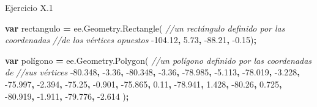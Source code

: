 \documentclass[
]{article}
\newenvironment{Shaded}{\begin{snugshade}}{\end{snugshade}}
\newcommand{\AttributeTok}[1]{\textcolor[rgb]{0.77,0.63,0.00}{#1}}
\newcommand{\CommentTok}[1]{\textcolor[rgb]{0.56,0.35,0.01}{\textit{#1}}}
\newcommand{\FloatTok}[1]{\textcolor[rgb]{0.00,0.00,0.81}{#1}}
\newcommand{\KeywordTok}[1]{\textcolor[rgb]{0.13,0.29,0.53}{\textbf{#1}}}
\newcommand{\NormalTok}[1]{#1}
\newcommand{\OperatorTok}[1]{\textcolor[rgb]{0.81,0.36,0.00}{\textbf{#1}}}
\newcommand{\VariableTok}[1]{\textcolor[rgb]{0.00,0.00,0.00}{#1}}
\begin{document}
Ejercicio X.1

\begin{Shaded}
\begin{Highlighting}[]
\KeywordTok{var}\NormalTok{ rectangulo }\OperatorTok{=} \VariableTok{ee}\NormalTok{.}\VariableTok{Geometry}\NormalTok{.}\AttributeTok{Rectangle}\NormalTok{(  }\CommentTok{//un rectángulo definido por las coordenadas }
\CommentTok{//de los vértices opuestos}
  \FloatTok{-104.12}\OperatorTok{,} \FloatTok{5.73}\OperatorTok{,}
  \FloatTok{-88.21}\OperatorTok{,} \FloatTok{-0.15}\NormalTok{)}\OperatorTok{;} 

\KeywordTok{var}\NormalTok{ polígono }\OperatorTok{=} \VariableTok{ee}\NormalTok{.}\VariableTok{Geometry}\NormalTok{.}\AttributeTok{Polygon}\NormalTok{(  }\CommentTok{//un polígono definido por las coordenadas de }
\CommentTok{//sus vértices}
  \FloatTok{-80.348}\OperatorTok{,} \FloatTok{-3.36}\OperatorTok{,}
  \FloatTok{-80.348}\OperatorTok{,} \FloatTok{-3.36}\OperatorTok{,}
  \FloatTok{-78.985}\OperatorTok{,} \FloatTok{-5.113}\OperatorTok{,}
  \FloatTok{-78.019}\OperatorTok{,} \FloatTok{-3.228}\OperatorTok{,}
  \FloatTok{-75.997}\OperatorTok{,} \FloatTok{-2.394}\OperatorTok{,}
  \FloatTok{-75.25}\OperatorTok{,} \FloatTok{-0.901}\OperatorTok{,}
  \FloatTok{-75.865}\OperatorTok{,} \FloatTok{0.11}\OperatorTok{,}
  \FloatTok{-78.941}\OperatorTok{,} \FloatTok{1.428}\OperatorTok{,}
  \FloatTok{-80.26}\OperatorTok{,} \FloatTok{0.725}\OperatorTok{,}
  \FloatTok{-80.919}\OperatorTok{,} \FloatTok{-1.911}\OperatorTok{,}
  \FloatTok{-79.776}\OperatorTok{,} \FloatTok{-2.614}
\NormalTok{  )}\OperatorTok{;}


\end{Highlighting}
\end{Shaded}
\end{document}
